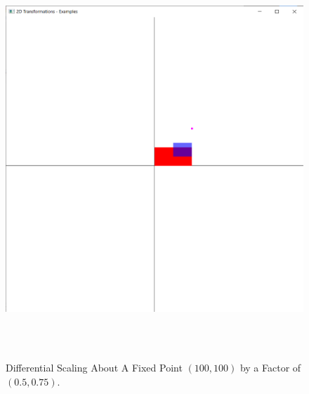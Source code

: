 \documentclass[12pt, a4]{article}
\begin{document}
\subsection*{}
\begin{figure}[h]
\centering
\caption{Differential Scaling About A Fixed Point $(100, 100)$ by a Factor of $(0.5, 0.75)$.}
\includegraphics[height=15cm, width=15cm]{Outputs/Output-11.png}
\end{figure}

\newpage
\end{document}
